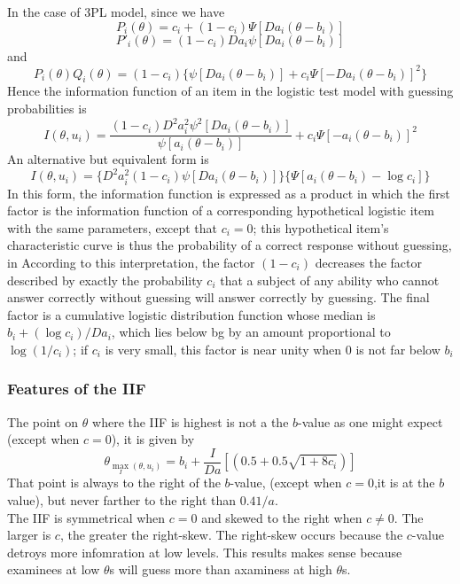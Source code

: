 In the case of 3PL model, since we have
\begin{equation}
P_i(\theta)=c_i +(1-c_i)\Psi[Da_i(\theta-b_i)]
\end{equation}
\begin{equation}
P'_i(\theta)=(1-c_i)Da_i\psi[Da_i(\theta-b_i)]
\end{equation}
and
\begin{equation}
P_i(\theta)Q_i(\theta)=(1-c_i)\{\psi[Da_i(\theta-b_i)]+c_i\Psi[-Da_i(\theta-b_i)]^2 \}
\end{equation}
Hence the information function of an item in the logistic test model with guessing probabilities is
\begin{equation}\label{eq:3plIIF}
I(\theta,u_i)=\frac{(1-c_i)D^2a_i^2\psi^2[Da_i(\theta-b_i)]}{\psi[a_i(\theta-b_i)]}+c_i\Psi[-a_i(\theta-b_i)]^2
\end{equation}
An alternative but equivalent form is
\begin{equation}\label{eq:3plIIF}
I(\theta,u_i)=\{D^2a_i^2(1-c_i)\psi[Da_i(\theta-b_i)] \} \{ \Psi[a_i(\theta-b_i)-\log c_i]\}
\end{equation}
In this form, the information function is expressed as a product in which the first factor is the information function of a corresponding hypothetical logistic item with the same parameters, except that $c_i = 0$; this hypothetical item's characteristic curve is thus the probability of a correct response without guessing,
in According to this interpretation, the factor $(1 - c_i)$ decreases the factor described by exactly
the probability $c_i$ that a subject of any ability who cannot answer correctly without guessing will answer correctly by guessing. The final factor is a cumulative logistic distribution function whose median is $b_i+ (\log c_i)/Da_i$, which lies below bg by an amount proportional to $\log (1/c_i)$; if $c_i$ is very small, this factor is near unity when 0 is not far below $ b_i$

\subsubsection{Features of the IIF}
The point on $\theta$ where the IIF is highest is not a the $b$-value as one might expect (except when $c=0$), it is given by
\begin{equation}
\theta_{\max_I(\theta,u_i) }=b_i+\frac{I}{Da} \left[ \left( 0.5+0.5 \sqrt{1+8c_i} \right) \right]
\end{equation}
That point is always to the right of the $b$-value, (except when $c=0$,it is at the $b$ value), but never farther to the right than $0.41/a$.\\
The IIF is symmetrical when $c=0$ and skewed to the right when $c\neq0$. The larger is $c$, the greater the right-skew. The right-skew occurs because the $c$-value detroys more infomration at low levels. This results makes sense because examinees at low $\theta$s will guess more than axaminess at high $\theta$s.


